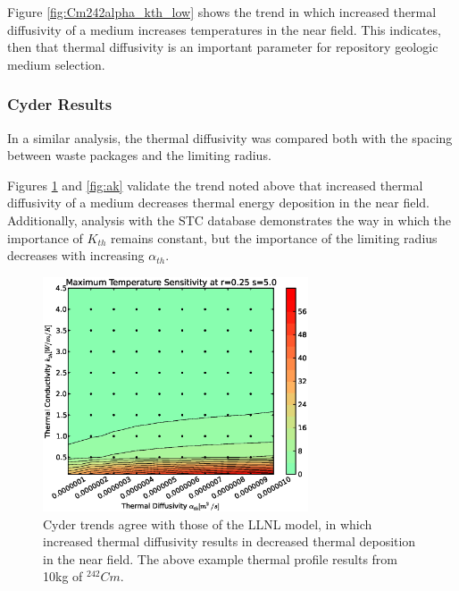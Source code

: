 Figure \ref{fig:Cm242alpha_kth_low} shows the trend in which increased thermal 
diffusivity of a medium increases temperatures in the near field. This 
indicates, then that thermal diffusivity is an important parameter for 
repository geologic medium selection.

%


\FloatBarrier
\subsubsection{Cyder Results}

In a similar analysis, the thermal diffusivity was compared both with the 
spacing between waste packages and the limiting radius. 

Figures \ref{fig:ar} and \ref{fig:ak} validate the trend noted above that 
increased thermal diffusivity of a medium decreases thermal energy deposition 
in the near field.  Additionally, analysis with the \Cyder STC database 
demonstrates the way in which the importance of $K_{th}$ remains constant, but 
the importance of the limiting radius decreases with increasing $\alpha_{th}$.

\begin{figure}[htbp!]
\begin{center}
\includegraphics[width=0.7\textwidth]{./chapters/demonstration/diffusivity/ak.eps}
\end{center}
\caption[$\alpha_{th}$ vs. $K_{th}$ Sensitivity in Cyder]{Cyder trends agree
with those of the LLNL model, in which increased thermal diffusivity results in 
decreased thermal deposition in the near field. The above example thermal 
profile results from 10kg of $^{242}Cm$.} 
\label{fig:ar}
\end{figure}


